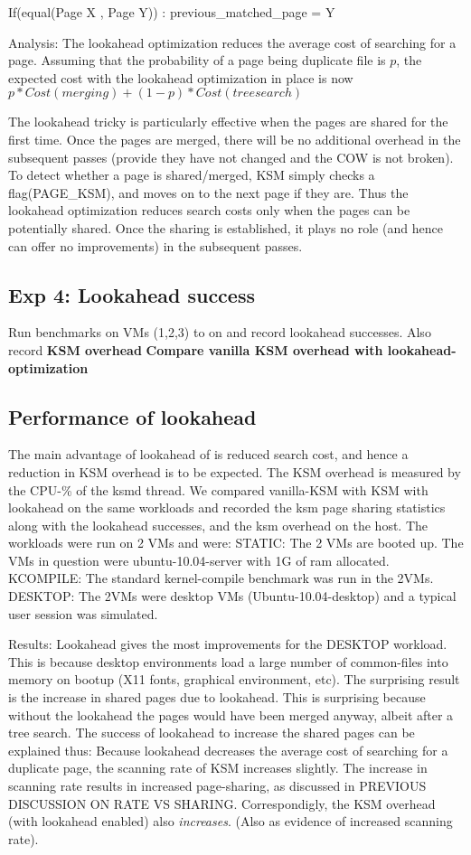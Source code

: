 \documentclass[10pt,a4paper]{article}
\begin{document}
If(equal(Page X , Page Y)) :
   previous_matched_page = Y

Analysis:
The lookahead optimization reduces the average cost of searching for a page. Assuming that the probability of a page being duplicate file is $p$, the expected cost with the lookahead optimization in place is now 
$p*Cost(merging) + (1-p)*Cost(tree search)$

The lookahead tricky is particularly effective when the pages are shared for the first time. Once the pages are merged, there will be no additional overhead in the subsequent passes (provide they have not changed and the COW is not broken). To detect whether a page is shared/merged, KSM simply checks a flag(PAGE_KSM), and moves on to the next page if they are. 
Thus the lookahead optimization reduces search costs only when the pages can be potentially shared. Once the sharing is established, it plays no role (and hence can offer no improvements) in the subsequent passes. 

\subsection{Exp 4: Lookahead success}

Run benchmarks on VMs (1,2,3) to on and record lookahead successes. Also record \textbf{KSM overhead}
\textbf{Compare vanilla KSM overhead with lookahead-optimization}

\subsection {Performance of lookahead}
The main advantage of lookahead of is reduced search cost, and hence a reduction in KSM overhead is to be expected. The KSM overhead is measured by the CPU-\% of the ksmd thread.
We compared vanilla-KSM with KSM with lookahead on the same workloads and recorded the ksm page sharing statistics along with the lookahead successes, and the ksm overhead on the host.
The workloads were run on 2 VMs and were:
STATIC: The 2 VMs are booted up. The VMs in question were ubuntu-10.04-server with 1G of ram allocated.
KCOMPILE: The standard kernel-compile benchmark was run in the 2VMs. 
DESKTOP: The 2VMs were desktop VMs (Ubuntu-10.04-desktop) and a typical user session was simulated.


Results: Lookahead gives the most improvements for the DESKTOP workload. This is because desktop environments load a large number of common-files into memory on bootup (X11 fonts, graphical environment, etc).
The surprising result is the increase in shared pages due to lookahead. This is surprising because without the lookahead the pages would have been merged anyway, albeit after a tree search. The success of lookahead to increase the shared pages can be explained thus:
Because lookahead decreases the average cost of searching for a duplicate page, the scanning rate of KSM increases slightly. The increase in scanning rate results in increased page-sharing, as discussed in PREVIOUS DISCUSSION ON RATE VS SHARING.
Correspondigly, the KSM overhead (with lookahead enabled) also \emph{increases}. (Also as evidence of increased scanning rate).
\end{document}

